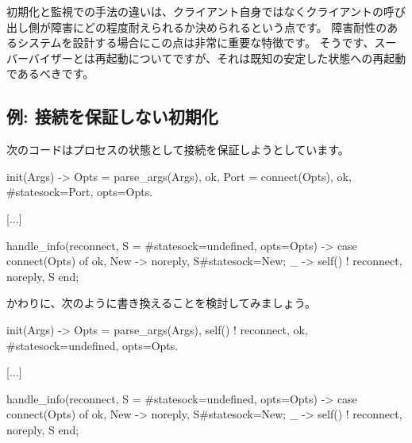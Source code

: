 初期化と監視での手法の違いは、クライアント自身ではなくクライアントの呼び出し側が障害にどの程度耐えられるか決められるという点です。
障害耐性のあるシステムを設計する場合にこの点は非常に重要な特徴です。
そうです、スーバーバイザーとは再起動についてですが、それは既知の安定した状態への再起動であるべきです。

\subsection{例: 接続を保証しない初期化}
\label{subsec:start-link-initializing-without-guaranteeing-connections}

次のコードはプロセスの状態として接続を保証しようとしています。

\begin{VerbatimText}
init(Args) ->
    Opts = parse_args(Args),
    {ok, Port} = connect(Opts),
    {ok, #state{sock=Port, opts=Opts}}.

[...]

handle_info(reconnect, S = #state{sock=undefined, opts=Opts}) ->
    case connect(Opts) of
        {ok, New} -> {noreply, S#state{sock=New}};
         _ -> self() ! reconnect, {noreply, S}
    end;
\end{VerbatimText}

かわりに、次のように書き換えることを検討してみましょう。

\begin{VerbatimText}
init(Args) ->
    Opts = parse_args(Args),
    self() ! reconnect,
    {ok, #state{sock=undefined, opts=Opts}}.

[...]

handle_info(reconnect, S = #state{sock=undefined, opts=Opts}) ->
    case connect(Opts) of
        {ok, New} -> {noreply, S#state{sock=New}};
        _ -> self() ! reconnect, {noreply, S}
    end;
\end{VerbatimText}


